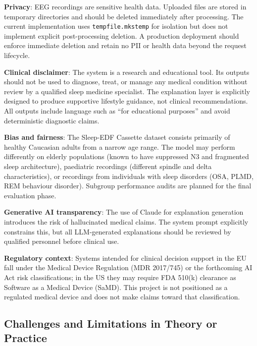 \documentclass[10pt]{article}
\begin{document}
\textbf{Privacy}: EEG recordings are sensitive health data. Uploaded files are stored in temporary directories and should be deleted immediately after processing. The current implementation uses \texttt{tempfile.mkstemp} for isolation but does not implement explicit post-processing deletion. A production deployment should enforce immediate deletion and retain no PII or health data beyond the request lifecycle.

\textbf{Clinical disclaimer}: The system is a research and educational tool. Its outputs should not be used to diagnose, treat, or manage any medical condition without review by a qualified sleep medicine specialist. The explanation layer is explicitly designed to produce supportive lifestyle guidance, not clinical recommendations. All outputs include language such as ``for educational purposes'' and avoid deterministic diagnostic claims.

\textbf{Bias and fairness}: The Sleep-EDF Cassette dataset consists primarily of healthy Caucasian adults from a narrow age range. The model may perform differently on elderly populations (known to have suppressed N3 and fragmented sleep architecture), paediatric recordings (different spindle and delta characteristics), or recordings from individuals with sleep disorders (OSA, PLMD, REM behaviour disorder). Subgroup performance audits are planned for the final evaluation phase.

\textbf{Generative AI transparency}: The use of Claude for explanation generation introduces the risk of hallucinated medical claims. The system prompt explicitly constrains this, but all LLM-generated explanations should be reviewed by qualified personnel before clinical use.

\textbf{Regulatory context}: Systems intended for clinical decision support in the EU fall under the Medical Device Regulation (MDR 2017/745) or the forthcoming AI Act risk classifications; in the US they may require FDA 510(k) clearance as Software as a Medical Device (SaMD). This project is not positioned as a regulated medical device and does not make claims toward that classification.

\subsection{Challenges and Limitations in Theory or Practice}
\label{sec:challenges}
\end{document}
